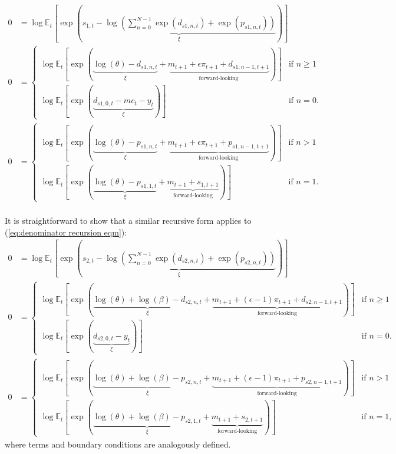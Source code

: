\documentclass[12 pt, oneside]{article}
\theoremstyle{definition}
\theoremstyle{definition}
\theoremstyle{definition}
\newcommand{\E}{\mathbb{E}}
\begin{document}
\begin{align}
  0 & = \log\E_t\left[\exp\left(\underbrace{s_{1, t} - \log\left(\sum_{n = 0}^{N - 1}\exp(d_{s1, n, t}) + \exp(p_{s1, n, t})\right)}_{\xi}\right)\right]\\
  0 & =
      \begin{cases}
        \log\E_t\left[\exp\left(\underbrace{\log(\theta) - d_{s1, n, t}}_{\xi} + \underbrace{m_{t + 1} + \epsilon \pi_{t + 1} + d_{s1, n - 1, t + 1}}_{\text{forward-looking}}\right)\right] & \text{if } n \geq 1\\
        \log\E_t\left[\exp\left(\underbrace{d_{s1, 0, t} - mc_t - y_t}_{\xi}\right)\right] & \text{if } n = 0.
      \end{cases}\\
  0 & =
      \begin{cases}
        \log\E_t\left[\exp\left(\underbrace{\log(\theta) - p_{s1, n, t}}_{\xi} + \underbrace{m_{t + 1} + \epsilon \pi_{t + 1} + p_{s1, n - 1, t + 1}}_{\text{forward-looking}} \right)\right] & \text{if } n > 1\\
        \log\E_t\left[\exp\left(\underbrace{\log(\theta) - p_{s1, 1, t}}_{\xi} + \underbrace{m_{t + 1} + s_{1, t + 1}}_{\text{forward-looking}}\right)\right] & \text{if } n = 1.
      \end{cases}
\end{align}
\\

It is straightforward to show that a similar recursive form applies to (\ref{eq:denominator recursion eqm}):
\begin{align}
  0 & = \log\E_t\left[\exp\left(\underbrace{s_{2, t} - \log\left(\sum_{n = 0}^{N - 1}\exp(d_{s2, n, t}) + \exp(p_{s2, n, t})\right)}_{\xi}\right)\right]\\
  0 & =
      \begin{cases}
        \log\E_t\left[\exp\left(\underbrace{\log(\theta) + \log(\beta) - d_{s2, n, t}}_{\xi} + \underbrace{m_{t + 1} + (\epsilon - 1) \pi_{t + 1} + d_{s2, n - 1, t + 1}}_{\text{forward-looking}}\right)\right] & \text{if } n \geq 1\\
        \log\E_t\left[\exp\left(\underbrace{d_{s2, 0, t} - y_t}_{\xi}\right)\right] & \text{if } n = 0.
      \end{cases}\\
  0 & =
      \begin{cases}
        \log\E_t\left[\exp\left(\underbrace{\log(\theta) + \log(\beta) - p_{s2, n, t}}_{\xi} + \underbrace{m_{t + 1} + (\epsilon - 1) \pi_{t + 1} + p_{s2, n - 1, t + 1}}_{\text{forward-looking}} \right)\right] & \text{if } n > 1\\
        \log\E_t\left[\exp\left(\underbrace{\log(\theta) + \log(\beta) - p_{s2, 1, t}}_{\xi} + \underbrace{m_{t + 1} + s_{2, t + 1}}_{\text{forward-looking}}\right)\right] & \text{if } n = 1,
      \end{cases}
\end{align}
where terms and boundary conditions are analogously defined.
\end{document}
